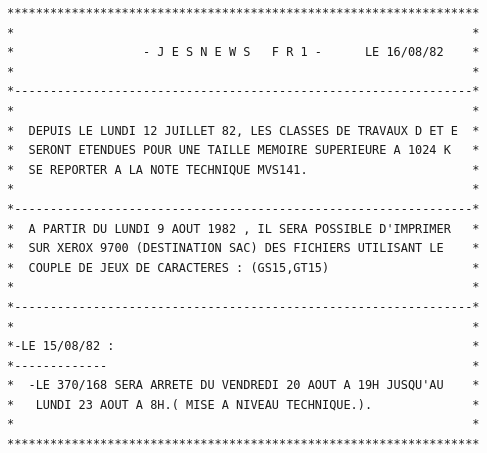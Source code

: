 \begin{verbatim}
******************************************************************
*                                                                *
*                  - J E S N E W S   F R 1 -      LE 16/08/82    *
*                                                                *
*----------------------------------------------------------------*
*                                                                *
*  DEPUIS LE LUNDI 12 JUILLET 82, LES CLASSES DE TRAVAUX D ET E  *
*  SERONT ETENDUES POUR UNE TAILLE MEMOIRE SUPERIEURE A 1024 K   *
*  SE REPORTER A LA NOTE TECHNIQUE MVS141.                       *
*                                                                *
*----------------------------------------------------------------*
*  A PARTIR DU LUNDI 9 AOUT 1982 , IL SERA POSSIBLE D'IMPRIMER   *
*  SUR XEROX 9700 (DESTINATION SAC) DES FICHIERS UTILISANT LE    *
*  COUPLE DE JEUX DE CARACTERES : (GS15,GT15)                    *
*                                                                *
*----------------------------------------------------------------*
*                                                                *
*-LE 15/08/82 :                                                  *
*-------------                                                   *
*  -LE 370/168 SERA ARRETE DU VENDREDI 20 AOUT A 19H JUSQU'AU    *
*   LUNDI 23 AOUT A 8H.( MISE A NIVEAU TECHNIQUE.).              *
*                                                                *
******************************************************************
\end{verbatim}
